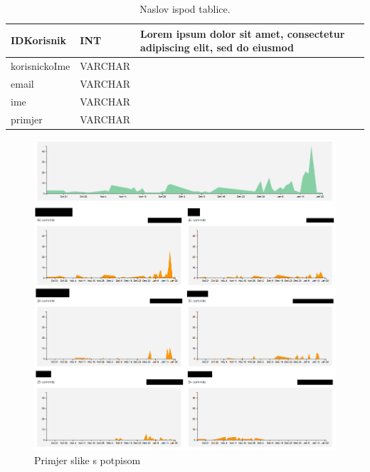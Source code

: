 		\begin{table}[H]
			
			\begin{longtabu} to \textwidth {|X[8, l]|X[8, l]|X[16, l]|} 
				
				\hline 
				\endfirsthead
				
				\hline 
				\endhead
				
				\hline 
				\endlastfoot
				
				IDKorisnik & INT	&  	Lorem ipsum dolor sit amet, consectetur adipiscing elit, sed do eiusmod  	\\ \hline
				korisnickoIme	& VARCHAR &   	\\ \hline 
				email & VARCHAR &   \\ \hline 
				ime & VARCHAR	&  		\\ \hline 
				 primjer	& VARCHAR &   	\\ \hline 
				
				
			\end{longtabu}
	
			\caption{\label{tab:referencatablica} Naslov ispod tablice.}
		\end{table}
		
		
		\begin{figure}[H]
			\includegraphics[scale=0.4]{slike/aktivnost.PNG} %
			\centering
			\caption{Primjer slike s potpisom}
			\label{fig:promjene}
		\end{figure}
		
